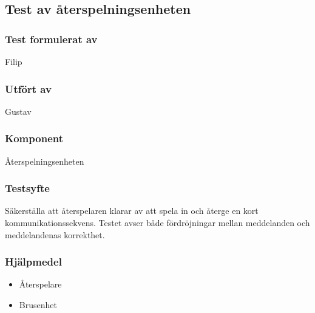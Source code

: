 \clearpage
\subsection{Test av återspelningsenheten}
\label{test:replayer}

\setlength{\columnsep}{1cm}




\begin{multicols}{2}
\subsubsection*{Test formulerat av}
Filip

\subsubsection*{Utfört av}
Gustav


\end{multicols}
\subsubsection*{Komponent}
Återspelningsenheten


\subsubsection*{Testsyfte}
Säkerställa att återspelaren klarar av att spela in och återge en kort kommunikationssekvens.
Testet avser både fördröjningar mellan meddelanden och meddelandenas korrekthet.


\subsubsection*{Hjälpmedel}
\begin{itemize}
	\item Återspelare
	\item Brusenhet
\end{itemize}



